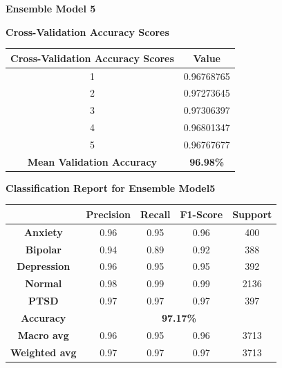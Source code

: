 \pagebreak

\noindent
\textbf{Ensemble Model 5}

\begin{center}
    \textbf{Cross-Validation Accuracy Scores} \\[0.5em]
    \begin{tabular}{|c|c|}
        \hline
        \textbf{Cross-Validation Accuracy Scores} & \textbf{Value} \\ \hline
        1 & 0.96768765 \\ \hline
        2 & 0.97273645 \\ \hline
        3 & 0.97306397 \\ \hline
        4 & 0.96801347 \\ \hline
        5 & 0.96767677 \\ \hline
        \textbf{Mean Validation Accuracy} & \textbf{96.98\%} \\ \hline
    \end{tabular}
\end{center}


\begin{center}
    \textbf{Classification Report for Ensemble Model5} \\[0.5em]
    \begin{tabular}{|c|c|c|c|c|}
        \hline
        & \textbf{Precision} & \textbf{Recall} & \textbf{F1-Score} & \textbf{Support} \\ \hline
        \textbf{Anxiety}    & 0.96 & 0.95 & 0.96 & 400 \\ \hline
        \textbf{Bipolar}    & 0.94 & 0.89 & 0.92 & 388 \\ \hline
        \textbf{Depression} & 0.96 & 0.95 & 0.95 & 392 \\ \hline
        \textbf{Normal}     & 0.98 & 0.99 & 0.99 & 2136 \\ \hline
        \textbf{PTSD}       & 0.97 & 0.97 & 0.97 & 397 \\ \hline
        \textbf{Accuracy}   & \multicolumn{4}{c|}{\textbf{97.17\%}} \\ \hline
        \textbf{Macro avg}  & 0.96 & 0.95 & 0.96 & 3713 \\ \hline
        \textbf{Weighted avg} & 0.97 & 0.97 & 0.97 & 3713 \\ \hline
    \end{tabular}
\end{center}

